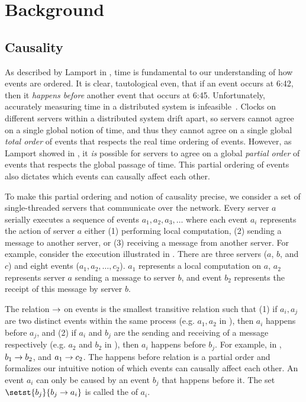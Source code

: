 \newcommand{\ttt}[1]{\texttt{#1}}

\section{Background}

\subsection{Causality}
As described by Lamport in \cite{lamport1978time}, time is fundamental to our
understanding of how events are ordered. It is clear, tautological even, that if
an event occurs at 6:42, then it \emph{happens before} another event that
occurs at 6:45. Unfortunately, accurately measuring time in a distributed
system is infeasible~\cite{marzullo1984maintaining, sampath2012synchronization,
schmid2000orthogonal}. Clocks on different servers within a distributed system
drift apart, so servers cannot agree on a single global notion of time, and
thus they cannot agree on a single global \emph{total order} of events that
respects the real time ordering of events. However, as Lamport showed in
\cite{lamport1978time}, it \emph{is} possible for servers to agree on a global
\emph{partial order} of events that respects the global passage of time. This
partial ordering of events also dictates which events can causally affect each
other.

To make this partial ordering and notion of causality precise, we consider a
set of single-threaded servers that communicate over the network. Every server
$a$ serially executes a sequence of events $a_1, a_2, a_3, \ldots$ where each
event $a_i$ represents the action of server $a$ either (1) performing local
computation, (2) sending a message to another server, or (3) receiving a
message from another server. For example, consider the execution illustrated in
. There are three servers ($a$, $b$, and $c$) and eight
events ($a_1, a_2, \ldots, c_2$).  $a_1$ represents a local computation on $a$,
$a_2$ represents server $a$ sending a message to server $b$, and event $b_2$
represents the receipt of this message by server $b$.

{}

The  relation $\to$ on events is the
smallest transitive relation such that
%
(1)
  if $a_i, a_j$ are two distinct events within the same process (e.g. $a_1,
  a_2$ in ), then $a_i$ happens before $a_j$, and
(2)
  if $a_i$ and $b_j$ are the sending and receiving of a message respectively
  (e.g. $a_2$ and $b_2$ in ), then $a_i$ happens before
  $b_j$.
%
For example, in , $b_1 \to b_2$, and $a_1
\to c_2$. The happens before relation is a partial order and
formalizes our intuitive notion of which events can causally affect each other.
An event $a_i$ can only be caused by an event $b_j$ that happens before it.
The set $\setst{b_j}{b_j \happensbefore a_i}$ is called the  of $a_i$.


